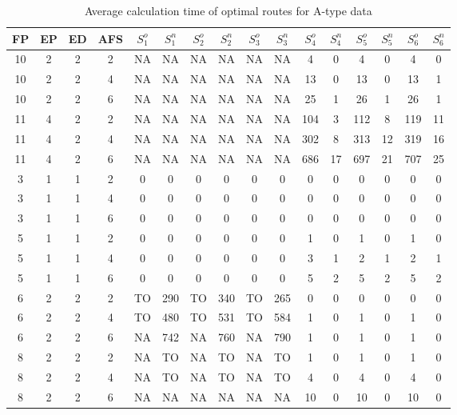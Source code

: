 \begin{longtable}{|c|c|c|c|c c|c c|c c|c c|c c|c c|}
\caption{Average calculation time of optimal routes for A-type data}
\label{tab:avg_time_a} \\
\hline
 FP & EP & ED & AFS & $S^o_1$ & $S^n_1$ & $S^o_2$ & $S^n_2$ & $S^o_3$ & $S^n_3$ & $S^o_4$ & $S^n_4$ & $S^o_5$ & $S^n_5$ & $S^o_6$ & $S^n_6$ \\
\hline\hline
10 & 2 & 2 & 2 & NA & NA & NA & NA & NA & NA & 4 & 0 & 4 & 0 & 4 & 0 \\
\hline
10 & 2 & 2 & 4 & NA & NA & NA & NA & NA & NA & 13 & 0 & 13 & 0 & 13 & 1 \\
\hline
10 & 2 & 2 & 6 & NA & NA & NA & NA & NA & NA & 25 & 1 & 26 & 1 & 26 & 1 \\
\hline
11 & 4 & 2 & 2 & NA & NA & NA & NA & NA & NA & 104 & 3 & 112 & 8 & 119 & 11 \\
\hline
11 & 4 & 2 & 4 & NA & NA & NA & NA & NA & NA & 302 & 8 & 313 & 12 & 319 & 16 \\
\hline
11 & 4 & 2 & 6 & NA & NA & NA & NA & NA & NA & 686 & 17 & 697 & 21 & 707 & 25 \\
\hline
3 & 1 & 1 & 2 & 0 & 0 & 0 & 0 & 0 & 0 & 0 & 0 & 0 & 0 & 0 & 0 \\
\hline
3 & 1 & 1 & 4 & 0 & 0 & 0 & 0 & 0 & 0 & 0 & 0 & 0 & 0 & 0 & 0 \\
\hline
3 & 1 & 1 & 6 & 0 & 0 & 0 & 0 & 0 & 0 & 0 & 0 & 0 & 0 & 0 & 0 \\
\hline
5 & 1 & 1 & 2 & 0 & 0 & 0 & 0 & 0 & 0 & 1 & 0 & 1 & 0 & 1 & 0 \\
\hline
5 & 1 & 1 & 4 & 0 & 0 & 0 & 0 & 0 & 0 & 3 & 1 & 2 & 1 & 2 & 1 \\
\hline
5 & 1 & 1 & 6 & 0 & 0 & 0 & 0 & 0 & 0 & 5 & 2 & 5 & 2 & 5 & 2 \\
\hline
6 & 2 & 2 & 2 & TO & 290 & TO & 340 & TO & 265 & 0 & 0 & 0 & 0 & 0 & 0 \\
\hline
6 & 2 & 2 & 4 & TO & 480 & TO & 531 & TO & 584 & 1 & 0 & 1 & 0 & 1 & 0 \\
\hline
6 & 2 & 2 & 6 & NA & 742 & NA & 760 & NA & 790 & 1 & 0 & 1 & 0 & 1 & 0 \\
\hline
8 & 2 & 2 & 2 & NA & TO & NA & TO & NA & TO & 1 & 0 & 1 & 0 & 1 & 0 \\
\hline
8 & 2 & 2 & 4 & NA & TO & NA & TO & NA & TO & 4 & 0 & 4 & 0 & 4 & 0 \\
\hline
8 & 2 & 2 & 6 & NA & NA & NA & NA & NA & NA & 10 & 0 & 10 & 0 & 10 & 0 \\
\hline
\end{longtable}